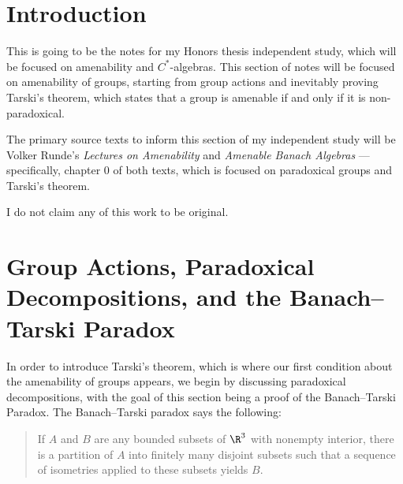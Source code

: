 \documentclass[10pt]{mypackage}
\begin{document}
\RaggedRight
\tableofcontents
\section{Introduction}%
This is going to be the notes for my Honors thesis independent study, which will be focused on amenability and $C^{\ast}$-algebras. This section of notes will be focused on amenability of groups, starting from group actions and inevitably proving Tarski's theorem, which states that a group is amenable if and only if it is non-paradoxical.\newline

The primary source texts to inform this section of my independent study will be Volker Runde's \textit{Lectures on Amenability} and \textit{Amenable Banach Algebras} --- specifically, chapter $0$ of both texts, which is focused on paradoxical groups and Tarski's theorem.\newline

I do not claim any of this work to be original.
\section{Group Actions, Paradoxical Decompositions, and the Banach--Tarski Paradox}%
In order to introduce Tarski's theorem, which is where our first condition about the amenability of groups appears, we begin by discussing paradoxical decompositions, with the goal of this section being a proof of the Banach--Tarski Paradox. The Banach--Tarski paradox says the following:
\begin{quote}
  If $A$ and $B$ are any bounded subsets of $\R^{3}$ with nonempty interior, there is a partition of $A$ into finitely many disjoint subsets such that a sequence of isometries applied to these subsets yields $B$.
\end{quote}
\end{document}
